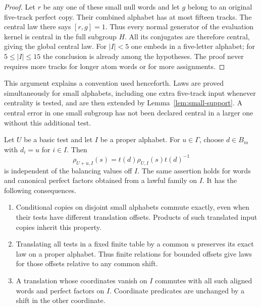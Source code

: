 \begin{proof}
Let $r$ be any one of these small null words and let $g$ belong
to an original five-track perfect copy.  Their combined
alphabet has at most fifteen tracks.  The central law there
says $[r,g]=1$.  Thus every normal generator of the evaluation
kernel is central in the full subgroup $H$.  All its conjugates
are therefore central, giving the global central law.  For
$|I|<5$ one embeds in a five-letter alphabet; for
$5\le|I|\le15$ the conclusion is already among the hypotheses.
The proof never requires more tracks for longer atom words or
for more assignments.
\end{proof}

This argument explains a convention used henceforth.  Laws are
proved simultaneously for small alphabets, including one extra
five-track input whenever centrality is tested, and are then
extended by Lemma~\ref{lem:small-support}.  A central error in
one small subgroup has not been declared central in a larger
one without this additional test.

\begin{lemma}\label{lem:translated-copies}
Let $U$ be a basic test and let $I$ be a proper alphabet.  For
$u\in\Gamma$, choose $d\in B_m$ with $d_i=u$ for $i\in I$.
Then
\begin{equation}\label{eq:translated-copy}
 \rho_{U+u,I}(s)
   =t(d)\rho_{U,I}(s)t(d)^{-1}
\end{equation}
is independent of the balancing values off $I$.  The same
assertion holds for words and canonical perfect factors obtained
from a lawful family on $I$.  It has the following consequences.
\begin{enumerate}[label=(\alph*)]
\item Conditional copies on disjoint small alphabets commute
      exactly, even when their tests have different translation
      offsets.  Products of such translated input copies inherit
      this property.
\item Translating all tests in a fixed finite table by a common
      $u$ preserves its exact law on a proper alphabet.  Thus
      finite relations for bounded offsets give laws for those
      offsets relative to any common shift.
\item A translation whose coordinates vanish on $I$ commutes
      with all such aligned words and perfect factors on $I$.
      Coordinate predicates are unchanged by a shift in the
      other coordinate.
\end{enumerate}
\end{lemma}

